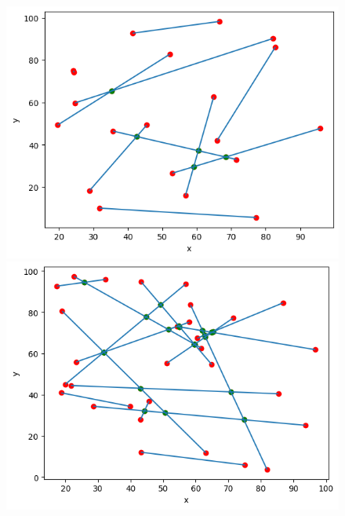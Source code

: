 \documentclass[11pt]{scrartcl}
\begin{document}
    \begin{figure}[H]
        \centering
        \begin{minipage}{0.45\linewidth}
          \centering
          \includegraphics[width=1\linewidth]{4_2.png}
          \caption{}
        \end{minipage}
        \begin{minipage}{0.45\linewidth}
          \centering
          \includegraphics[width=1\linewidth]{4_3.png}
          \caption{}
        \end{minipage}
    \end{figure}
\end{document}
